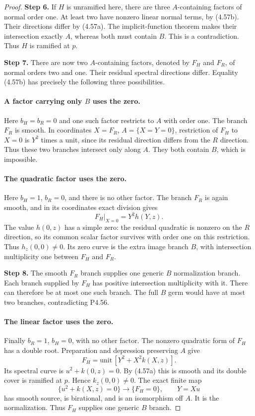 \begin{proof}
\noindent\textbf{Step 6.} If $H$ is unramified here, there are three
$A$-containing factors of normal order one. At least
two have nonzero linear normal terms, by (4.57b).
Their directions differ by (4.57a). The implicit-function
theorem makes their intersection exactly $A$, whereas
both must contain $B$. This is a contradiction.
Thus $H$ is ramified at $p$.

\noindent\textbf{Step 7.} There are now two $A$-containing factors, denoted by
$F_H$ and $F_R$, of normal orders two and one. Their
residual spectral directions differ. Equality (4.57b)
has precisely the following three possibilities.

\paragraph{A factor carrying only $B$ uses the zero.}
Here $b_H=b_R=0$ and one such factor restricts to $A$
with order one. The branch $F_R$ is smooth. In coordinates
$X=F_R$, $A=\{X=Y=0\}$, restriction of $F_H$ to $X=0$
is $Y^2$ times a unit, since its residual direction
differs from the $R$ direction. Thus these two branches
intersect only along $A$. They both contain $B$, which
is impossible.

\paragraph{The quadratic factor uses the zero.}
Here $b_H=1$, $b_R=0$, and there is no other factor.
The branch $F_R$ is again smooth, and in its coordinates
exact division gives
\[
                         F_H|_{X=0}=Y^2h(Y,z).
\]
The value $h(0,z)$ has a simple zero: the residual
quadratic is nonzero on the $R$ direction, so its
common scalar factor survives with order one on this
restriction. Thus $h_z(0,0)\ne0$. Its zero curve is the
extra image branch $B$, with intersection multiplicity
one between $F_H$ and $F_R$.

\noindent\textbf{Step 8.} The smooth $F_R$ branch supplies one generic $B$
normalization branch. Each branch supplied by $F_H$
has positive intersection multiplicity with it. There
can therefore be at most one such branch. The full
$B$ germ would have at most two branches, contradicting
P4.56.

\paragraph{The linear factor uses the zero.}
Finally $b_R=1$, $b_H=0$, with no other factor.
The nonzero quadratic form of $F_H$ has a double root.
Preparation and depression preserving $A$ give
\[
                   F_H=\text{unit}\,[Y^2+X^2k(X,z)].
\]
Its spectral curve is $u^2+k(0,z)=0$. By (4.57a) this
is smooth and its double cover is ramified at $p$.
Hence $k_z(0,0)\ne0$. The exact finite map
\[
 \{u^2+k(X,z)=0\}\longrightarrow\{F_H=0\},
                         \qquad Y=Xu
\]
has smooth source, is birational, and is an isomorphism
off $A$. It is the normalization. Thus $F_H$ supplies
one generic $B$ branch.


\end{proof}
